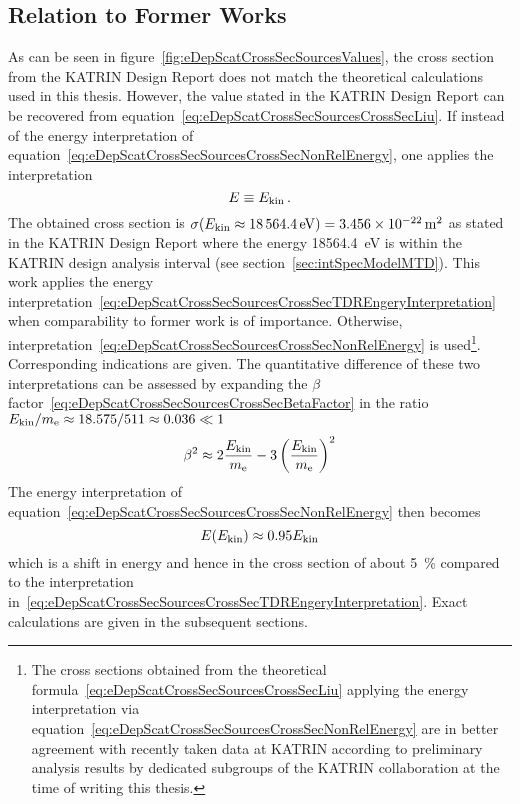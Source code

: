 \subsection{Relation to Former Works}
\label{sec:eDepScatCrossSecSourcesChoice}
As can be seen in figure~\ref{fig:eDepScatCrossSecSourcesValues}, the cross section from the KATRIN Design Report does not match the theoretical calculations used in this thesis. However, the value stated in the KATRIN Design Report can be recovered from equation~\eqref{eq:eDepScatCrossSecSourcesCrossSecLiu}. If instead of the energy interpretation
of equation~\ref{eq:eDepScatCrossSecSourcesCrossSecNonRelEnergy}, one applies the interpretation
\begin{equation}
	\label{eq:eDepScatCrossSecSourcesCrossSecTDREngeryInterpretation}
	E \equiv E_\mathrm{kin}
	\text{\,.}
\end{equation}
The obtained cross section is $\sigma(E_\mathrm{kin} \approx \SI{18564.4}{eV}) = \SI{3.456e-22}{m^2}$ as stated in the KATRIN Design Report where the energy \SI{18564.4}{eV} is within the KATRIN design analysis interval (see section~\ref{sec:intSpecModelMTD}). This work applies the energy interpretation~\eqref{eq:eDepScatCrossSecSourcesCrossSecTDREngeryInterpretation} when comparability to former work is of importance. Otherwise, interpretation~\eqref{eq:eDepScatCrossSecSourcesCrossSecNonRelEnergy} is used\footnote{The cross sections obtained from the theoretical formula~\eqref{eq:eDepScatCrossSecSourcesCrossSecLiu} applying the energy interpretation via equation~\eqref{eq:eDepScatCrossSecSourcesCrossSecNonRelEnergy} are in better agreement with recently taken data at KATRIN according to preliminary analysis results by dedicated subgroups of the KATRIN collaboration at the time of writing this thesis.}. Corresponding indications are given. The quantitative difference of these two interpretations can be assessed by expanding the $\beta$ factor~\eqref{eq:eDepScatCrossSecSourcesCrossSecBetaFactor} in the ratio $E_\mathrm{kin}/m_{\mathrm{e}} \approx 18.575/511 \approx 0.036 \ll 1$
\begin{equation}
	\beta^2 \approx 
	2 \frac{E_\mathrm{kin}}{m_{\mathrm{e}}} - 
	3 \left(\frac{E_\mathrm{kin}}{m_{\mathrm{e}}}\right)^2
\end{equation}
The energy interpretation of equation~\eqref{eq:eDepScatCrossSecSourcesCrossSecNonRelEnergy} then becomes
\begin{equation}
	E(E_\mathrm{kin}) \approx 0.95 E_\mathrm{kin}
\end{equation}
which is a shift in energy and hence in the cross section of about \SI{5}{\percent} compared to the interpretation in~\eqref{eq:eDepScatCrossSecSourcesCrossSecTDREngeryInterpretation}. Exact calculations are given in the subsequent sections.

